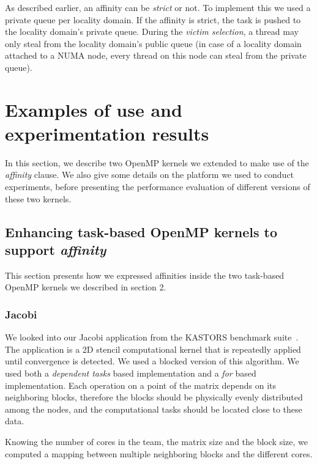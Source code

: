 \documentclass{Styles/llncs}
\begin{document}
As described earlier, an affinity can be \emph{strict} or not. To implement this we used
a private queue per locality domain. If the affinity is strict, the task is pushed to the locality domain's private queue.
During the \textit{victim selection}, a thread may only steal from the locality domain's
public queue (in case of a locality domain attached to a NUMA node, every thread on this node can steal from the private queue).

\section{Examples of use and experimentation results}

In this section, we describe two OpenMP kernels we extended to make use of the \emph{affinity} clause. We also give some details on the platform we used to conduct experiments, before presenting the performance evaluation of different versions of these two kernels.

\subsection{Enhancing task-based OpenMP kernels to support \emph{affinity}}

This section presents how we expressed affinities inside the two task-based OpenMP kernels we described in section 2.

\subsubsection{Jacobi}

We looked into our Jacobi application from the KASTORS benchmark suite~\cite{virouleau:hal-01081974}.
The application is a 2D stencil computational kernel that is repeatedly applied until
convergence is detected. We used a blocked version of this algorithm.
We used both a \emph{dependent tasks} based implementation and a \emph{for} based implementation.
Each operation on a point of the matrix depends on its neighboring blocks,
therefore the blocks should be physically evenly distributed among the nodes,
and the computational tasks should be located close to these data.

Knowing the number of cores in the team, the matrix size and the block size, we computed a mapping
between multiple neighboring blocks and the different cores.
\end{document}
